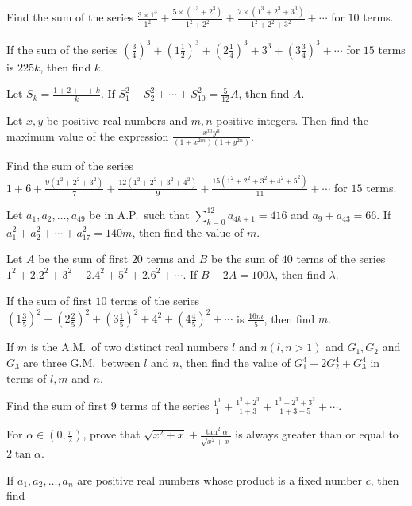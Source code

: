 \item Find the sum of the series $\frac{3\times1^3}{1^2} + \frac{5\times(1^3 + 2^3)}{1^2 + 2^2}
  + \frac{7\times(1^3 + 2^3 + 3^3)}{1^2 + 2^2 + 3^2} + \cdots$ for $10$ terms.
\item If the sum of the series $\left(\frac{3}{4}\right)^3 + \left(1\frac{1}{2}\right)^3
  + \left(2\frac{1}{4}\right)^3 + 3^3 + \left(3\frac{3}{4}\right)^3 + \cdots$ for $15$ terms is $225k$, then
  find $k$.
\item Let $S_k = \frac{1 + 2 + \cdots + k}{k}$. If $S_1^2 + S_2^2 + \cdots + S_{10}^2 = \frac{5}{12}A$, then
  find $A$.
\item Let $x, y$ be positive real numbers and $m, n$ positive integers. Then find the maximum value of the
  expression $\frac{x^my^n}{\left(1 + x^{2m}\right)\left(1 + y^{2n}\right)}$.
\item Find the sum of the series $1 + 6 + \frac{9(1^2 + 2^2 + 3^2)}{7} + \frac{12(1^2 + 2^2 + 3^2 + 4^2)}{9}
  + \frac{15(1^2 + 2^2 + 3^2 + 4^2 + 5^2)}{11} + \cdots$ for $15$ terms.
\item Let $a_1, a_2, \ldots, a_{49}$ be in A.P.\ such that $\displaystyle\sum_{k = 0}^{12}a_{4k + 1} = 416$
  and $a_9 + a_{43} = 66$. If $a_1^2 + a_2^2 + \cdots + a_{17}^2 = 140m$, then find the value of $m$.
\item Let $A$ be the sum of first $20$ terms and $B$ be the sum of $40$ terms of the series $1^2 + 2.2^2 +
  3^2 + 2.4^2 + 5^2 + 2.6^2 + \cdots$. If $B - 2A = 100\lambda$, then find $\lambda$.
\item If the sum of first $10$ terms of the series $\left(1\frac{3}{5}\right)^2
  + \left(2\frac{2}{5}\right)^2 + \left(3\frac{1}{5}\right)^2 + 4^2 + \left(4\frac{4}{5}\right)^2 + \cdots$
  is $\frac{16m}{5}$, then find $m$.
\item If $m$ is the A.M.\ of two distinct real numbers $l$ and $n(l, n > 1)$ and $G_1, G_2$ and $G_3$ are
  three G.M.\ between $l$ and $n$, then find the value of $G_1^4 + 2G_2^4 + G_3^4$ in terms of $l, m$ and
  $n$.
\item Find the sum of first $9$ terms of the series $\frac{1^3}{1} + \frac{1^3 + 2^3}{1 + 3} + \frac{1^3 +
  2^3 + 3^3}{1 + 3 + 5} + \cdots$.
\item For $\alpha\in\left(0, \frac{\pi}{2}\right)$, prove that $\sqrt{x^2 + x}
  + \frac{\tan^2\alpha}{\sqrt{x^2 + x}}$ is always greater than or equal to $2\tan\alpha$.
\item If $a_1, a_2, \ldots, a_n$ are positive real numbers whose product is a fixed number $c$, then find
